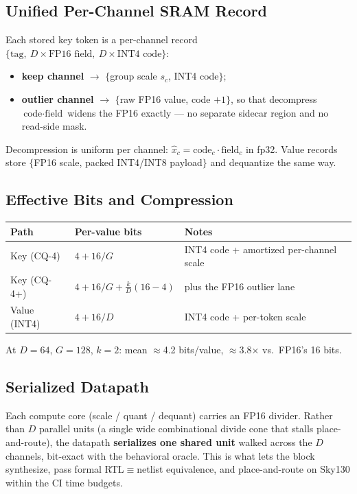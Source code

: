 \documentclass[11pt]{article}
\begin{document}
\subsection{Unified Per-Channel SRAM Record}
Each stored key token is a per-channel record
$\{\text{tag},\ D\times\text{FP16 field},\ D\times\text{INT4 code}\}$:
\begin{itemize}
\item \textbf{keep channel} $\to$ $\{$group scale $s_c$, INT4 code$\}$;
\item \textbf{outlier channel} $\to$ $\{$raw FP16 value, code $+1\}$, so that
      decompress $\text{code}\cdot\text{field}$ widens the FP16 exactly --- no
      separate sidecar region and no read-side mask.
\end{itemize}
Decompression is uniform per channel: $\hat{x}_c = \text{code}_c \cdot
\text{field}_c$ in fp32. Value records store $\{$FP16 scale, packed INT4/INT8
payload$\}$ and dequantize the same way.

\subsection{Effective Bits and Compression}
\begin{table}[h]
\centering
\small
\begin{tabular}{@{}l l l@{}}
\toprule
Path & Per-value bits & Notes \\
\midrule
Key (CQ-4)   & $4 + 16/G$        & INT4 code + amortized per-channel scale \\
Key (CQ-4+)  & $4 + 16/G + \frac{k}{D}(16{-}4)$ & plus the FP16 outlier lane \\
Value (INT4) & $4 + 16/D$        & INT4 code + per-token scale \\
\bottomrule
\end{tabular}
\end{table}
\noindent At $D{=}64$, $G{=}128$, $k{=}2$: mean $\approx$4.2 bits/value,
$\approx$3.8$\times$ vs.\ FP16's 16 bits.

\subsection{Serialized Datapath}
Each compute core (scale / quant / dequant) carries an FP16 divider. Rather than
$D$ parallel units (a single wide combinational divide cone that stalls
place-and-route), the datapath \textbf{serializes one shared unit} walked across
the $D$ channels, bit-exact with the behavioral oracle. This is what lets the
block synthesize, pass formal RTL$\equiv$netlist equivalence, and place-and-route
on Sky130 within the CI time budgets.
\end{document}
